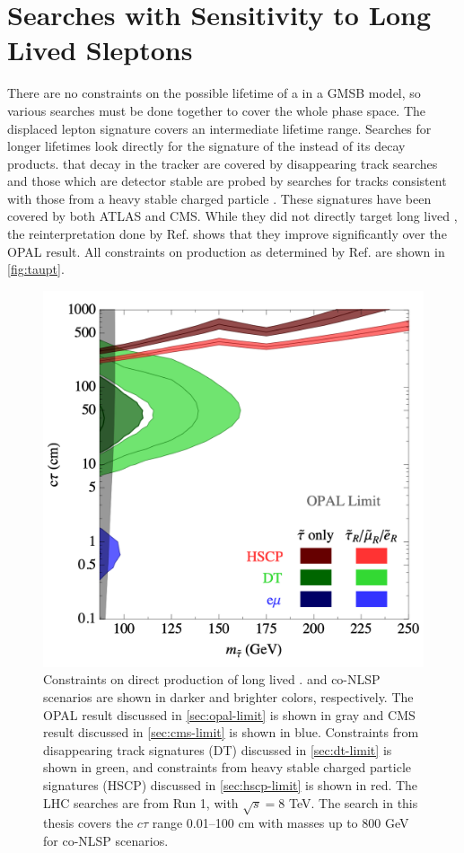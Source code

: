 \section{Searches with Sensitivity to Long Lived Sleptons}

There are no constraints on the possible lifetime of a \slep in a \ac{GMSB} model, so various searches must be done together to cover the whole phase space. The displaced lepton signature covers an intermediate lifetime range. Searches for longer lifetimes look directly for the signature of the \slep instead of its decay products. \slep that decay in the tracker are covered by disappearing track searches \cite{SUSY-2016-06,CMS-EXO-16-044,SUSY-2011-14,CMS-EXO-12-034} and those which are detector stable are probed by searches for tracks consistent with those from a heavy stable charged particle \cite{SUSY-2016-02,SUSY-2011-03,CMS-EXO-16-044}. These signatures have been covered by both \ac{ATLAS} and \ac{CMS}. While they did not directly target long lived \slep, the reinterpretation done by Ref. \cite{jesseshelton} shows that they improve significantly over the OPAL result. All constraints on \slep production as determined by Ref. \cite{jesseshelton} are shown in \autoref{fig:taupt}. 

\begin{figure}[!h]
\centering
\includegraphics[width=.6\textwidth]{figures/theory/slep-limits.png}
\caption{Constraints on direct production of long lived \slep. \stau and co-NLSP scenarios are shown in darker and brighter colors, respectively. The OPAL result discussed in \autoref{sec:opal-limit} is shown in gray and \ac{CMS} result discussed in \autoref{sec:cms-limit} is shown in blue. Constraints from disappearing track signatures (DT) discussed in \autoref{sec:dt-limit} is shown in green, and constraints from heavy stable charged particle signatures (HSCP) discussed in \autoref{sec:hscp-limit} is shown in red. The \ac{LHC} searches are from Run 1, with $\sqrt{s} = 8$ TeV. The search in this thesis covers the $c \tau$ range 0.01--100 cm with masses up to 800 GeV for co-NLSP scenarios. \cite{jesseshelton}}
\label{fig:taupt}
\end{figure}


